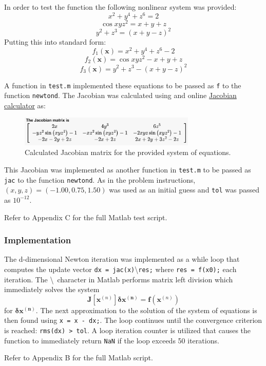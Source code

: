 \documentclass[10pt]{article}
\def\code#1{\texttt{#1}}
\begin{document}
In order to test the function the following nonlinear system was provided: 
$$x^2+y^4+z^6=2$$
$$\cos{xyz^2}=x+y+z$$
$$y^2+z^3=(x+y-z)^2$$
Putting this into standard form:
$$f_1(\mathbf{x})=x^2+y^4+z^6-2$$
$$f_2(\mathbf{x})=\cos{xyz^2}-x+y+z$$
$$f_3(\mathbf{x})=y^2+z^3-(x+y-z)^2$$

A function in \code{test.m} implemented these equations to be passed as \code{f} to the function \code{newtond}.
The Jacobian was calculated using and online
\href{https://www.emathhelp.net/en/calculators/calculus-3/jacobian-calculator/}{Jacobian calculator} as:

\begin{figure}[h!]
\centering
\includegraphics[width=0.75\textwidth]{Jacobian.png}
\caption{Calculated Jacobian matrix for the provided system of equations.}
\end{figure}

This Jacobian was implemented as another function in \code{test.m} to be passed as \code{jac} to the function 
\code{newtond}. As in the problem instructions, $(x, y, z) = (-1.00, 0.75, 1.50)$ was used as an initial guess
and \code{tol} was passed as $10^{-12}$.

Refer to Appendix C for the full Matlab test script. 

\subsubsection*{Implementation}

The d-dimensional Newton iteration was implemented as a while loop that computes the update vector 
\code{dx = jac(x)}\textbackslash\code{res;} where \code{res = f(x0);} each iteration. The \textbackslash\ character 
in Matlab performs matrix left division which immediately solves the system
$$\mathbf{J}[\mathbf{x}^{(n)}]\mathbf{\delta x^{(n)}} = \mathbf{f}(\mathbf{x}^{(n)})$$ for $\mathbf{\delta x^{(n)}}$.
The next approximation to the solution of the system of equations is then found using \code{x = x - dx;}. The loop 
continues until the convergence criterion is reached: \code{rms(dx) > tol}. A loop iteration counter is utilized that
causes the function to immediately return \code{NaN} if the loop exceeds 50 iterations.

Refer to Appendix B for the full Matlab script.
\end{document}

